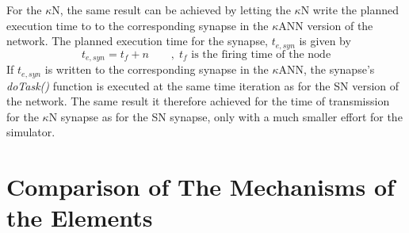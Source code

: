 		For the $\kappa$N, the same result can be achieved by letting the $\kappa$N write the planned execution time to to the corresponding synapse in the $\kappa$ANN version of the network.
		The planned execution time for the synapse, $t_{e, syn}$ is given by
		\begin{equation}
			t_{e,syn} = t_f+n \qquad, \; \text{$t_f$ is the firing time of the node}
		\end{equation}
		If $t_{e, syn}$ is written to the corresponding synapse in the $\kappa$ANN, the synapse's \emph{doTask()} function is executed at the same time iteration as for the SN version of the network.
		The same result it therefore achieved for the time of transmission for the $\kappa$N synapse as for the SN synapse, only with a much smaller effort for the simulator.



























\section{Comparison of The Mechanisms of the Elements}
\label{secComparisonOfMechanismsOfNodeElements}
